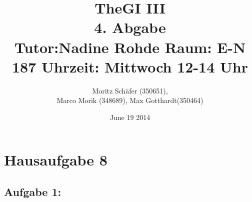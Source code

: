\documentclass[10pt,a4paper,german,landscape,fleqn]{article} \usepackage[utf8]{inputenc} %
\begin{document}
\title{TheGI III \\
4. Abgabe\\
Tutor:Nadine Rohde Raum: E-N 187 Uhrzeit: Mittwoch 12-14 Uhr \\ } %
\author{Moritz Schäfer (350651), \\
Marco Morik (348689), Max Gotthardt(350464)} %
\date{June 19 2014} %

\maketitle



\newpage
\section*{Hausaufgabe 8}
\subsection*{Aufgabe 1:}
\end{document}
